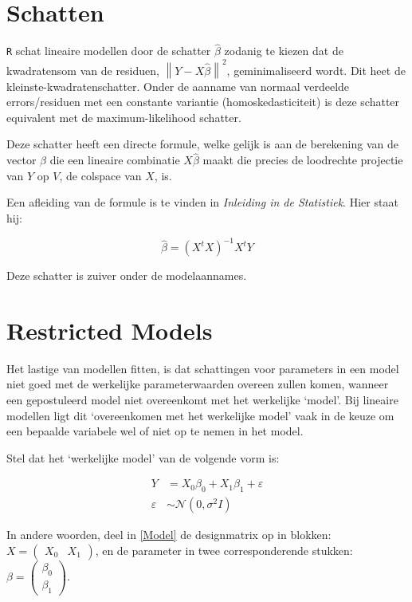 \documentclass[a4paper]{report}
\newcommand{\norm}[1]{\left\lVert#1\right\rVert}
\begin{document}
\section{Schatten}
  \verb!R! schat lineaire modellen door de schatter $\hat{\beta}$ zodanig te kiezen dat de kwadratensom van de residuen, $\norm{Y-X\hat{\beta}}^2$, geminimaliseerd wordt. Dit heet de kleinste-kwadratenschatter. Onder de aanname van normaal verdeelde errors/residuen met een constante variantie (homoskedasticiteit) is deze schatter equivalent met de maximum-likelihood schatter.
  
  Deze schatter heeft een directe formule, welke gelijk is aan de berekening van de vector $\hat{\beta}$ die een lineaire combinatie $X\hat{\beta}$ maakt die precies de loodrechte projectie van $Y$ op $V$, de colspace van $X$, is.
  
  Een afleiding van de formule is te vinden in \emph{Inleiding in de Statistiek}. Hier staat hij:
  
  \begin{equation}
  \label{kleinste kwadraten schatter}
  \hat{\beta} = (X^tX)^{-1}X^tY
  \end{equation}
  
  Deze schatter is zuiver onder de modelaannames.

\section{Restricted Models}
  Het lastige van modellen fitten, is dat schattingen voor parameters in een model niet goed met de werkelijke parameterwaarden overeen zullen komen, wanneer een gepostuleerd model niet overeenkomt met het werkelijke `model'. Bij lineaire modellen ligt dit `overeenkomen met het werkelijke model' vaak in de keuze om een bepaalde variabele wel of niet op te nemen in het model.
  
  Stel dat het `werkelijke model' van de volgende vorm is:
  
  \begin{align}
  Y &= X_0\beta_0 + X_1\beta_1 + \varepsilon \\
  \varepsilon &\sim \mathcal{N}(0,\sigma^2I)
  \end{align}
  
  In andere woorden, deel in \ref{Model} de designmatrix op in blokken: $X = \begin{pmatrix} X_0 & X_1 \end{pmatrix}$, en de parameter in twee corresponderende stukken: ${\beta = \begin{pmatrix} \beta_0 \\ \beta_1 \end{pmatrix}}$. 
  
\end{document}
